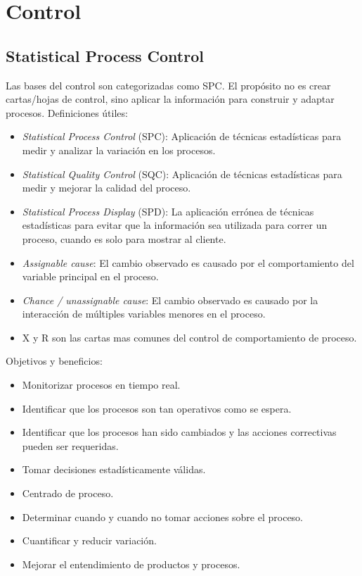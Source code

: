 \documentclass[oneside]{book}
\begin{document}
\part{Control}
\chapter{Statistical Process Control}

Las bases del control son categorizadas como SPC. El propósito no es crear cartas/hojas de control, sino aplicar la información para construir y adaptar procesos.
Definiciones útiles:
\begin{itemize}
	\item \textit{Statistical Process Control} (SPC): Aplicación de técnicas estadísticas para medir y analizar la variación en los procesos.
	\item \textit{Statistical Quality Control} (SQC): Aplicación de técnicas estadísticas para medir y mejorar la calidad del proceso.
	\item \textit{Statistical Process Display} (SPD): La aplicación errónea de técnicas estadísticas para evitar que la información sea utilizada para correr un proceso, cuando es solo para mostrar al cliente. 
	\item \textit{Assignable cause}: El cambio observado es causado por el comportamiento del variable principal en el proceso.
	\item \textit{Chance / unassignable cause}: El cambio observado es causado por la interacción de múltiples variables menores en el proceso.
	\item X y R son las cartas mas comunes del control de comportamiento de proceso.
\end{itemize}
Objetivos y beneficios:
\begin{itemize}
	\item Monitorizar procesos en tiempo real.
	\item Identificar que los procesos son tan operativos como se espera.
	\item Identificar que los procesos han sido cambiados y las acciones correctivas pueden ser requeridas.
	\item Tomar decisiones estadísticamente válidas.
	\item Centrado de proceso.
	\item Determinar cuando y cuando no tomar acciones sobre el proceso.
	\item Cuantificar y reducir variación.
	\item Mejorar el entendimiento de productos y procesos.
\end{itemize}
\end{document}
